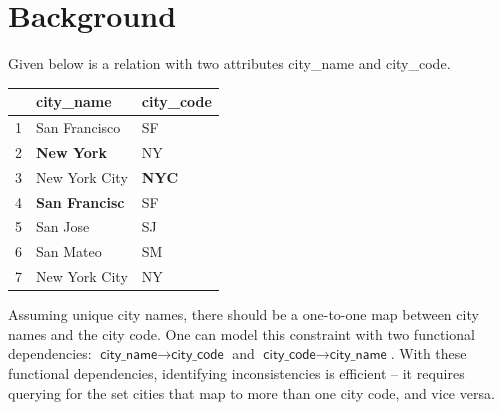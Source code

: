 
\section{Background}
Given below is a relation with two attributes \textsf{city\_name} and \textsf{city\_code}. 

\begin{table}[ht!]
\centering
\label{my-label}
\begin{tabular}{|l|l|l|}
\hline
\rowcolor[HTML]{000000} 
& {\color[HTML]{FFFFFF} city\_name}            & {\color[HTML]{FFFFFF} city\_code}   \\ \hline
1 & San Francisco                                & SF                                  \\ \hline
2& {\color[HTML]{FE0000} \textbf{New York}}     & NY                                  \\ \hline
3 & New York City                                & {\color[HTML]{FE0000} \textbf{NYC}} \\ \hline
4 & {\color[HTML]{FE0000} \textbf{San Francisc}} & SF                                  \\ \hline
5 & San Jose                                     & SJ                                  \\ \hline
6 & San Mateo                                    & SM                                  \\ \hline
7 & New York City                                & NY                                  \\ \hline
\end{tabular}
\end{table}

Assuming unique city names, there should be a one-to-one map between city names and the city code. One can model this constraint with two functional dependencies: $\textsf{city\_name} \rightarrow \textsf{city\_code}$ and $\textsf{city\_code} \rightarrow \textsf{city\_name}$.
With these functional dependencies, identifying inconsistencies is efficient -- it requires querying for the set cities that map to more than one city code, and vice versa.

